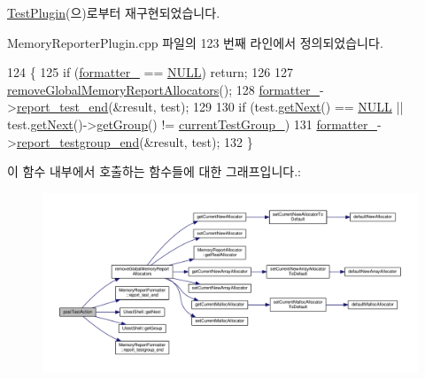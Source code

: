 \hyperlink{class_test_plugin_a4d9ea193c7b8e3eb8b50f985f688e4a8}{Test\+Plugin}(으)로부터 재구현되었습니다.



Memory\+Reporter\+Plugin.\+cpp 파일의 123 번째 라인에서 정의되었습니다.


\begin{DoxyCode}
124 \{
125     \textcolor{keywordflow}{if} (\hyperlink{class_memory_reporter_plugin_a09aec3af9ca6c3c27226a1aaaea13987}{formatter\_} == \hyperlink{openavb__types__base__pub_8h_a070d2ce7b6bb7e5c05602aa8c308d0c4}{NULL}) \textcolor{keywordflow}{return};
126 
127     \hyperlink{class_memory_reporter_plugin_ad599e1a65e36647a13aaccacace96328}{removeGlobalMemoryReportAllocators}();
128     \hyperlink{class_memory_reporter_plugin_a09aec3af9ca6c3c27226a1aaaea13987}{formatter\_}->\hyperlink{class_memory_report_formatter_ace6fc7f4a7c7cb5d702018d91d85ae62}{report\_test\_end}(&result, test);
129 
130     \textcolor{keywordflow}{if} (test.\hyperlink{class_utest_shell_a1ac818ddaedf486843c68a5852de42ff}{getNext}() == \hyperlink{openavb__types__base__pub_8h_a070d2ce7b6bb7e5c05602aa8c308d0c4}{NULL} || test.\hyperlink{class_utest_shell_a1ac818ddaedf486843c68a5852de42ff}{getNext}()->\hyperlink{class_utest_shell_a9d203c5f3c7cb6d28b66189a20735dca}{getGroup}() != 
      \hyperlink{class_memory_reporter_plugin_a4733051c1386e53d8d11c6b35922dbc7}{currentTestGroup\_})
131         \hyperlink{class_memory_reporter_plugin_a09aec3af9ca6c3c27226a1aaaea13987}{formatter\_}->\hyperlink{class_memory_report_formatter_aa6b20dc53db478226037eaac7ae7b49e}{report\_testgroup\_end}(&result, test);
132 \}
\end{DoxyCode}


이 함수 내부에서 호출하는 함수들에 대한 그래프입니다.\+:
\nopagebreak
\begin{figure}[H]
\begin{center}
\leavevmode
\includegraphics[width=350pt]{class_memory_reporter_plugin_a488f8809f966fc52513ee74afa87cda3_cgraph}
\end{center}
\end{figure}




